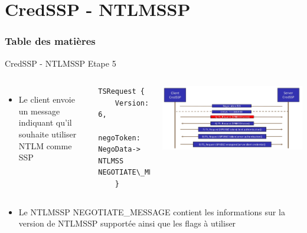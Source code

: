 \documentclass{beamer}
\begin{document}
\section{CredSSP - NTLMSSP}

\begin{frame}
	\frametitle{Table des matières}
	\tableofcontents[currentsection]
\end{frame}

\begin{frame}[fragile]{CredSSP - NTLMSSP Etape 5}
	 \begin{columns}[T]
	 	\begin{itemize}
	 	\item Le client envoie un message indiquant qu'il souhaite utiliser NTLM comme SSP
	 	\end{itemize}
	 \begin{lstlisting}[frame=single,basicstyle=\tiny]
TSRequest {
	Version:     6,
	negoToken:   NegoData-> NTLMSS NEGOTIATE\_MESSAGE
	}
	\end{lstlisting}
	 \includegraphics[scale=0.055]{step5.jpg}
	 \end{columns}
	 
	 \begin{itemize}
	 	\item Le NTLMSSP NEGOTIATE\_MESSAGE contient les informations sur la version de NTLMSSP supportée ainsi que les flags à utiliser
	 	\end{itemize}
\end{frame}
\end{document}
